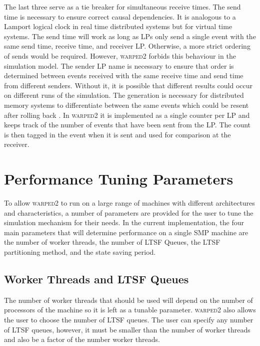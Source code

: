 \documentclass[11pt]{book}
\begin{document}
\noindent %
The last three serve as a tie breaker for simultaneous receive times.  The send time is
necessary to ensure correct causal dependencies.  It is analogous to a Lamport logical
clock\cite{lamport-78} in real time distributed systems but for virtual time systems.  The
send time will work as long as LPs only send a single event with the same send time, receive
time, and receiver LP.  Otherwise, a more strict ordering of sends would be required.  However,
\textsc{warped2} forbids this behaviour in the simulation model.  The sender LP name is necessary
to ensure that order is determined between events received with the same receive time and send
time from different senders.  Without it, it is possible that different results could occur on
different runs of the simulation\cite{ronngren-99}.  The generation is necessary for distributed
memory systems to differentiate between the same events which could be resent after rolling back
\cite{ronngren-99}.  In \textsc{warped2} it is implemented as a single counter per LP and
keeps track of the number of events that have been sent from the LP.  The count is then
tagged in the event when it is sent and used for comparison at the receiver.

\section{Performance Tuning Parameters}

To allow \textsc{warped2} to run on a large range of machines with different architectures and
characteristics, a number of parameters are provided for the user to tune the simulation mechanism
for their needs.  In the current implementation, the four main parameters that will determine
performance on a single SMP machine are the number of worker threads, the number of LTSF Queues,
the LTSF partitioning method, and the state saving period.

\subsection{Worker Threads and LTSF Queues}

The number of worker threads that should be used will depend on the number of processors of the
machine so it is left as a tunable parameter.  \textsc{warped2} also allows the user to choose
the number of LTSF queues.  The user can specify any number of LTSF queues, however, it must
be smaller than the number of worker threads and also be a factor of the number worker threads.  
\end{document}
